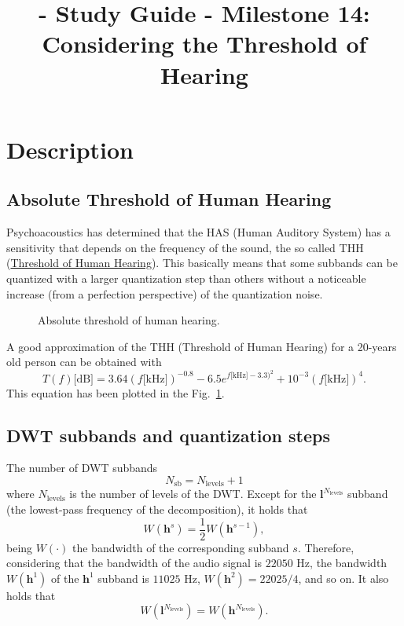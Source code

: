 
\title{\TM{} - Study Guide - Milestone 14: Considering the Threshold of Hearing}

\maketitle

\section{Description}

\subsection{Absolute Threshold of Human Hearing}
Psychoacoustics has determined that the HAS (Human Auditory System)
has a sensitivity that depends on the frequency of the sound, the so
called THH
(\href{https://en.wikipedia.org/wiki/Absolute_threshold_of_hearing}{Threshold
  of Human Hearing}). This basically means that some subbands can be
quantized with a larger quantization step than others without a
noticeable increase (from a perfection perspective) of the
quantization noise.

\begin{figure}
  \centering
  \caption{Absolute threshold of human hearing.}
  \label{fig:ToHH}
\end{figure}

A good approximation of the THH (Threshold of Human Hearing) for a 20-years old person can be
obtained with~\cite{bosi2003intro}
\begin{equation}
  T(f)\text{[dB]} = 3.64(f\text{[kHz]})^{-0.8} - 6.5e^{f\text{[kHz]}-3.3)^2} + 10^{-3}(f\text{[kHz]})^4.
  \label{eq:ToHH}
\end{equation}
This equation has been plotted in the Fig.~\ref{fig:ToHH}.

\subsection{DWT subbands and quantization steps}
The number of DWT subbands
\begin{equation}
  N_{\text{sb}} = N_{\text{levels}} + 1
\end{equation}
where $N_{\text{levels}}$ is the number of levels of the DWT. Except
for the ${\mathbf l}^{N_{\text{levels}}}$ subband (the lowest-pass
frequency of the decomposition), it holds that
\begin{equation}
  W({\mathbf h}^s) = \frac{1}{2}W({\mathbf h}^{s-1}),
\end{equation}
being $W(\cdot)$ the bandwidth of the corresponding
subband $s$. Therefore, considering that the bandwidth of the audio signal
is $22050$ Hz, the bandwidth $W({\mathbf h}^1)$ of the ${\mathbf h}^1$ subband is $11025$ Hz,
$W({\mathbf h} ^2)=22025/4$, and so on. It also holds that
\begin{equation}
  W({\mathbf l}^{N_{\text{levels}}}) = W({\mathbf h}^{N_{\text{levels}}}).
\end{equation}


